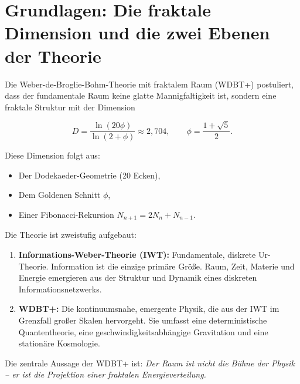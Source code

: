 \chapter{Grundlagen: Die fraktale Dimension und die zwei Ebenen der Theorie}

Die Weber-de-Broglie-Bohm-Theorie mit fraktalem Raum (WDBT+) postuliert, dass der fundamentale Raum keine glatte Mannigfaltigkeit ist, sondern eine fraktale Struktur
mit der Dimension

\begin{equation}
D = \frac{\ln(20\phi)}{\ln(2+\phi)} \approx 2,704, \qquad \phi = \frac{1+\sqrt{5}}{2}.
\end{equation}

Diese Dimension folgt aus:

\begin{itemize}
    \item Der Dodekaeder-Geometrie (20 Ecken),
    \item Dem Goldenen Schnitt \( \phi \),
    \item Einer Fibonacci-Rekursion \( N_{n+1} = 2N_n + N_{n-1} \).
\end{itemize}

Die Theorie ist zweistufig aufgebaut:

\begin{enumerate}
    \item \textbf{Informations-Weber-Theorie (IWT):} Fundamentale, diskrete Ur-Theorie. Information ist die einzige primäre Größe. Raum, Zeit, Materie und Energie emergieren aus der Struktur und Dynamik eines diskreten Informationsnetzwerks.
    \item \textbf{WDBT+:} Die kontinuumsnahe, emergente Physik, die aus der IWT im Grenzfall großer Skalen hervorgeht. Sie umfasst eine deterministische Quantentheorie, eine geschwindigkeitsabhängige Gravitation und eine stationäre Kosmologie.
\end{enumerate}

Die zentrale Aussage der WDBT+ ist: \emph{Der Raum ist nicht die Bühne der Physik – er ist die Projektion einer fraktalen Energieverteilung.}
